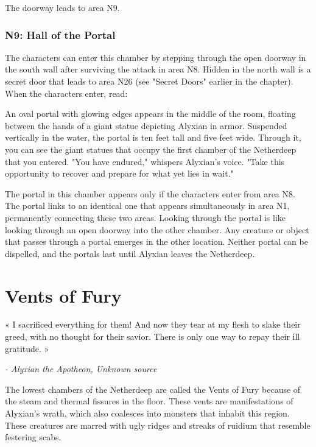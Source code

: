 \documentclass[10pt,a4,twoside,twocolumn,openany,nodeprecatedcode]{dndbook}
\begin{document}
The doorway leads to area N9.
\subsubsection{N9: Hall of the Portal}
The characters can enter this chamber by stepping through the open doorway in the south wall after surviving the attack in area N8. Hidden in the north wall is a secret door that leads to area N26 (see "Secret Doors" earlier in the chapter).
When the characters enter, read:
\begin{DndReadAloud}{}
An oval portal with glowing edges appears in the middle of the room, floating between the hands of a giant statue depicting Alyxian in armor. Suspended vertically in the water, the portal is ten feet tall and five feet wide. Through it, you can see the giant statues that occupy the first chamber of the Netherdeep that you entered.
"You have endured," whispers Alyxian's voice. "Take this opportunity to recover and prepare for what yet lies in wait."
\end{DndReadAloud}

The portal in this chamber appears only if the characters enter from area N8. The portal links to an identical one that appears simultaneously in area N1, permanently connecting these two areas. Looking through the portal is like looking through an open doorway into the other chamber. Any creature or object that passes through a portal emerges in the other location. Neither portal can be dispelled, and the portals last until Alyxian leaves the Netherdeep.
\section{Vents of Fury}
\begingroup
\DndSetThemeColor[DmgLavender]\begin{DndSidebar}{}
\Large \centering «
\large \centering I sacrificed everything for them! And now they tear at my flesh to slake their greed, with no thought for their savior. There is only one way to repay their ill gratitude.
\Large »
 
 \normalsize \raggedleft \textit{ - Alyxian the Apotheon, Unknown source}
\end{DndSidebar}
\endgroup
The lowest chambers of the Netherdeep are called the Vents of Fury because of the steam and thermal fissures in the floor. These vents are manifestations of Alyxian's wrath, which also coalesces into monsters that inhabit this region. These creatures are marred with ugly ridges and streaks of ruidium that resemble festering scabs.
\end{document}

